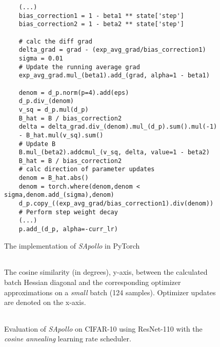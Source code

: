     \begin{figure}[H]
     \begin{verbatim}
    (...)
    bias_correction1 = 1 - beta1 ** state['step']
    bias_correction2 = 1 - beta2 ** state['step']

    # calc the diff grad
    delta_grad = grad - (exp_avg_grad/bias_correction1)
    sigma = 0.01
    # Update the running average grad
    exp_avg_grad.mul_(beta1).add_(grad, alpha=1 - beta1)

    denom = d_p.norm(p=4).add(eps)
    d_p.div_(denom)
    v_sq = d_p.mul(d_p)
    B_hat = B / bias_correction2
    delta = delta_grad.div_(denom).mul_(d_p).sum().mul(-1) 
    - B_hat.mul(v_sq).sum()
    # Update B
    B.mul_(beta2).addcmul_(v_sq, delta, value=1 - beta2)
    B_hat = B / bias_correction2
    # calc direction of parameter updates
    denom = B_hat.abs()
    denom = torch.where(denom,denom < sigma,denom.add_(sigma),denom)
    d_p.copy_((exp_avg_grad/bias_correction1).div(denom))
    # Perform step weight decay
    (...)
    p.add_(d_p, alpha=-curr_lr)
    \end{verbatim}
        \caption{The implementation of \emph{SApollo} in PyTorch}
        \label{fig:sapollo_imp}
    
        \end{figure}
    
        \begin{figure}[h!]
            \centering
         \begin{minipage}[b]{\textwidth}
                \centering
                \begin{tabular}{cc}
                \end{tabular}
                \caption{
                    The cosine similarity (in degrees), y-axis, between the calculated batch Hessian diagonal and the corresponding optimizer approximations on a \emph{small} batch (124 samples).
                    Optimizer updates are denoted on the x-axis.
                }
                \label{fig:sapollo-approx-weights}
            \end{minipage}
            \vfill
            \begin{minipage}[b]{\textwidth}
                \centering
                \begin{tabular}{cc}
                \end{tabular}
                \caption{
                    Evaluation of \emph{SApollo} on CIFAR-10 using ResNet-110 with the \emph{cosine annealing} learning rate scheduler.
                }
                \label{fig:sapollo-perf}
            \end{minipage}
        \end{figure}
        